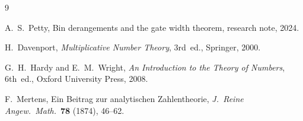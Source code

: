 \documentclass[12pt]{amsart}
\theoremstyle{definition}
\theoremstyle{remark}
\begin{document}
\begin{thebibliography}{9}

A.~S.~Petty,
Bin derangements and the gate width theorem,
research note, 2024.

H.~Davenport,
\emph{Multiplicative Number Theory},
3rd~ed., Springer, 2000.

G.~H.~Hardy and E.~M.~Wright,
\emph{An Introduction to the Theory of Numbers},
6th~ed., Oxford University Press, 2008.

F.~Mertens,
Ein Beitrag zur analytischen Zahlentheorie,
\emph{J.\ Reine Angew.\ Math.}\ \textbf{78} (1874), 46--62.

\end{thebibliography}
\end{document}
